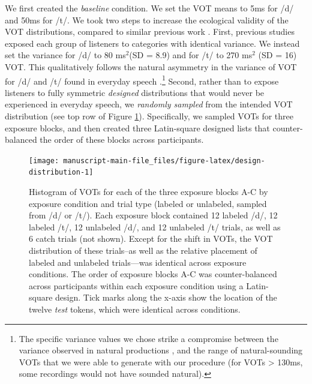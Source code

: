\documentclass[
  11pt,
  man,mask,floatsintext]{apa6}
\begin{document}
We first created the \emph{baseline} condition. We set the VOT means to 5ms for /d/ and 50ms for /t/. We took two steps to increase the ecological validity of the VOT distributions, compared to similar previous work \autocite{clayards2008,idemaru-holt2011,idemaru-holt2020,kleinschmidt2015,kleinschmidt2020}. First, previous studies exposed each group of listeners to categories with identical variance. We instead set the variance for /d/ to 80 ms\(^2\)(SD = 8.9) and for /t/ to 270 ms\(^2\) (SD = 16) VOT. This qualitatively follows the natural asymmetry in the variance of VOT for /d/ and /t/ found in everyday speech \autocite{lisker-abramson1964,docherty1992,chodroff-wilson2017}.\footnote{The specific variance values we chose strike a compromise between the variance observed in natural productions \autocite[e.g, mean by-talker variances of 29 ms\(^2\) for /d/ and 275 ms\(^2\) for /t/ in hyper-articulated isolated word productions, and 70 ms\(^2\) for /d/ and 410 ms\(^2\) for /t/ in connected speech,][]{chodroff-wilson2017}, and the range of natural-sounding VOTs that we were able to generate with our procedure (for VOTs \textgreater{} 130ms, some recordings would not have sounded natural).} Second, rather than to expose listeners to fully symmetric \emph{designed} distributions that would never be experienced in everyday speech, we \emph{randomly sampled} from the intended VOT distribution (see top row of Figure \ref{fig:design-distribution}). Specifically, we sampled VOTs for three exposure blocks, and then created three Latin-square designed lists that counter-balanced the order of these blocks across participants.



\begin{figure}

{\centering \texttt{[image: manuscript-main-file\_files/figure-latex/design-distribution-1]} 

}

\caption{Histogram of VOTs for each of the three exposure blocks A-C by exposure condition and trial type (labeled or unlabeled, sampled from /d/ or /t/). Each exposure block contained 12 labeled /d/, 12 labeled /t/, 12 unlabeled /d/, and 12 unlabeled /t/ trials, as well as 6 catch trials (not shown). Except for the shift in VOTs, the VOT distribution of these trials--as well as the relative placement of labeled and unlabeled trials---was identical across exposure conditions. The order of exposure blocks A-C was counter-balanced across participants within each exposure condition using a Latin-square design. Tick marks along the x-axis show the location of the twelve \emph{test} tokens, which were identical across conditions.}\label{fig:design-distribution}
\end{figure}
\end{document}
